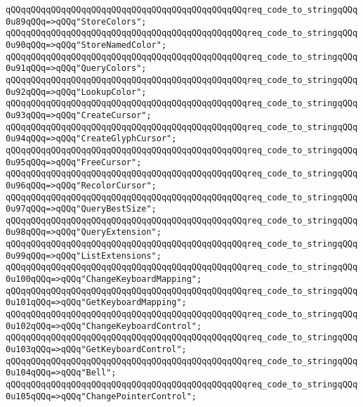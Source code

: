 \verb|qQQqqQQqqQQqqQQqqQQqqQQqqQQqqQQqqQQqqQQqqQQqqQQqreq_code_to_stringqQQq0u89qQQq=>qQQq"StoreColors";|\newline
\verb|qQQqqQQqqQQqqQQqqQQqqQQqqQQqqQQqqQQqqQQqqQQqqQQqreq_code_to_stringqQQq0u90qQQq=>qQQq"StoreNamedColor";|\newline
\verb|qQQqqQQqqQQqqQQqqQQqqQQqqQQqqQQqqQQqqQQqqQQqqQQqreq_code_to_stringqQQq0u91qQQq=>qQQq"QueryColors";|\newline
\verb|qQQqqQQqqQQqqQQqqQQqqQQqqQQqqQQqqQQqqQQqqQQqqQQqreq_code_to_stringqQQq0u92qQQq=>qQQq"LookupColor";|\newline
\verb|qQQqqQQqqQQqqQQqqQQqqQQqqQQqqQQqqQQqqQQqqQQqqQQqreq_code_to_stringqQQq0u93qQQq=>qQQq"CreateCursor";|\newline
\verb|qQQqqQQqqQQqqQQqqQQqqQQqqQQqqQQqqQQqqQQqqQQqqQQqreq_code_to_stringqQQq0u94qQQq=>qQQq"CreateGlyphCursor";|\newline
\verb|qQQqqQQqqQQqqQQqqQQqqQQqqQQqqQQqqQQqqQQqqQQqqQQqreq_code_to_stringqQQq0u95qQQq=>qQQq"FreeCursor";|\newline
\verb|qQQqqQQqqQQqqQQqqQQqqQQqqQQqqQQqqQQqqQQqqQQqqQQqreq_code_to_stringqQQq0u96qQQq=>qQQq"RecolorCursor";|\newline
\verb|qQQqqQQqqQQqqQQqqQQqqQQqqQQqqQQqqQQqqQQqqQQqqQQqreq_code_to_stringqQQq0u97qQQq=>qQQq"QueryBestSize";|\newline
\verb|qQQqqQQqqQQqqQQqqQQqqQQqqQQqqQQqqQQqqQQqqQQqqQQqreq_code_to_stringqQQq0u98qQQq=>qQQq"QueryExtension";|\newline
\verb|qQQqqQQqqQQqqQQqqQQqqQQqqQQqqQQqqQQqqQQqqQQqqQQqreq_code_to_stringqQQq0u99qQQq=>qQQq"ListExtensions";|\newline
\verb|qQQqqQQqqQQqqQQqqQQqqQQqqQQqqQQqqQQqqQQqqQQqqQQqreq_code_to_stringqQQq0u100qQQq=>qQQq"ChangeKeyboardMapping";|\newline
\verb|qQQqqQQqqQQqqQQqqQQqqQQqqQQqqQQqqQQqqQQqqQQqqQQqreq_code_to_stringqQQq0u101qQQq=>qQQq"GetKeyboardMapping";|\newline
\verb|qQQqqQQqqQQqqQQqqQQqqQQqqQQqqQQqqQQqqQQqqQQqqQQqreq_code_to_stringqQQq0u102qQQq=>qQQq"ChangeKeyboardControl";|\newline
\verb|qQQqqQQqqQQqqQQqqQQqqQQqqQQqqQQqqQQqqQQqqQQqqQQqreq_code_to_stringqQQq0u103qQQq=>qQQq"GetKeyboardControl";|\newline
\verb|qQQqqQQqqQQqqQQqqQQqqQQqqQQqqQQqqQQqqQQqqQQqqQQqreq_code_to_stringqQQq0u104qQQq=>qQQq"Bell";|\newline
\verb|qQQqqQQqqQQqqQQqqQQqqQQqqQQqqQQqqQQqqQQqqQQqqQQqreq_code_to_stringqQQq0u105qQQq=>qQQq"ChangePointerControl";|\newline
